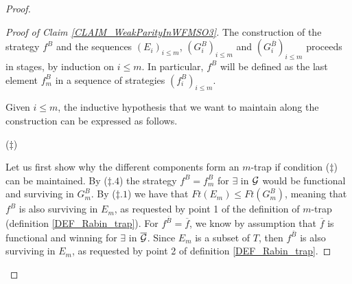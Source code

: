\begin{proof}
\begin{Iff-LR}
\begin{proof}[Proof of Claim \ref{CLAIM_WeakParityInWFMSO3}]
\smallskip

The construction of the strategy $f^{B}$ and the sequences $(E_i)_{i\leq m}$, $(G_i^{B})_{i\leq m}$ and $(G_i^{\overline{B}})_{i\leq m}$ proceeds in stages, by induction on $i \leq m$. In particular, $f^{B}$ will be defined as the last element $f^{B}_m$ in a sequence of strategies $(f^{B}_i)_{i\leq m}$.

Given $i\leq m$, the inductive hypothesis that we want to maintain along the construction can be expressed as follows.

\bigskip
\begin{center}
\hspace*{0.2cm}($\ddag$)
\end{center}

\bigskip

Let us first show why the different components form an $m$-trap if condition ($\ddag$) can be maintained. By ($\ddag . 4$) the strategy $f^{B} = f^{B}_m$ for $\exists$ in $\mathcal{G}$ would be functional and surviving in $G^{B}_{m}$. By ($\ddag . 1$) we have that $\mathit{Ft}(E_{m}) \leq \mathit{Ft}(G_{m}^{B})$, meaning that $f^{B}$ is also surviving in $E_{m}$, as requested by point 1 of the definition of $m$-trap (definition \ref{DEF_Rabin_trap}). For $f^{\overline{B}} = \overline{f}$, we know by assumption that $\overline{f}$ is functional and winning for $\exists$ in $\overline{\mathcal{G}}$. Since $E_m$ is a subset of $T$, then $f^{\overline{B}}$ is also surviving in $E_m$, as requested by point 2 of definition \ref{DEF_Rabin_trap}.


\end{proof}
\end{Iff-LR}
\end{proof}
